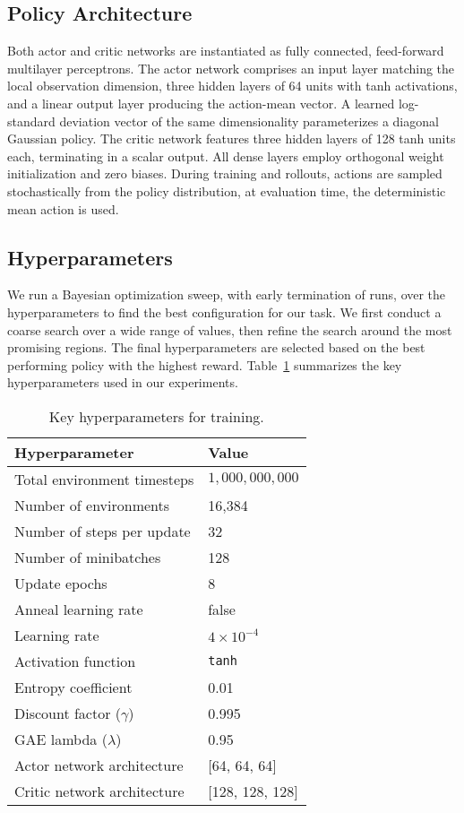 \subsection{Policy Architecture}
Both actor and critic networks are instantiated as fully connected, feed-forward multilayer perceptrons. The actor network comprises an input layer matching the local observation dimension, three hidden layers of 64 units with tanh activations, and a linear output layer producing the action-mean vector. A learned log-standard deviation vector of the same dimensionality parameterizes a diagonal Gaussian policy. The critic network features three hidden layers of 128 tanh units each, terminating in a scalar output. All dense layers employ orthogonal weight initialization and zero biases. During training and rollouts, actions are sampled stochastically from the policy distribution, at evaluation time, the deterministic mean action is used.

\subsection{Hyperparameters}
We run a Bayesian optimization sweep, with early termination of runs, over the hyperparameters to find the best configuration for our task. We first conduct a coarse search over a wide range of values, then refine the search around the most promising regions. The final hyperparameters are selected based on the best performing policy with the highest reward. Table~\ref{tab:hyperparams} summarizes the key hyperparameters used in our experiments.

\begin{table}[ht]
  \centering
  \caption{Key hyperparameters for training.}
  \label{tab:hyperparams}
  \begin{tabular}{@{}ll@{}}
    \toprule
    Hyperparameter & Value \\
    \midrule
    Total environment timesteps & $1{,}000{,}000{,}000$ \\
    Number of environments & 16,384 \\
    Number of steps per update & 32 \\
    Number of minibatches & 128 \\
    Update epochs & 8 \\
    Anneal learning rate & false \\
    Learning rate & $4\times10^{-4}$ \\
    Activation function & \texttt{tanh} \\
    Entropy coefficient & 0.01 \\
    Discount factor ($\gamma$) & 0.995 \\
    GAE lambda ($\lambda$) & 0.95 \\

    Actor network architecture & [64, 64, 64] \\
    Critic network architecture & [128, 128, 128] \\
    \bottomrule
  \end{tabular}
\end{table}

